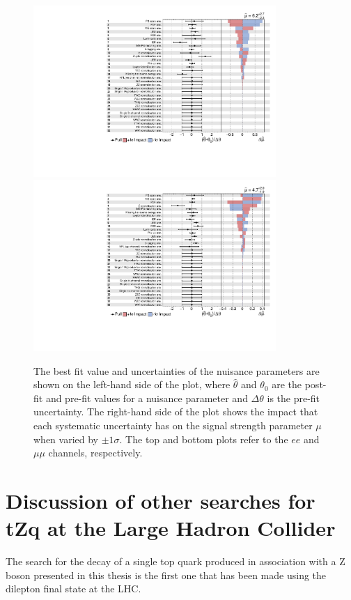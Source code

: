 \begin{figure}[htbp]
\begin{center}
\includegraphics[width=0.82\textwidth]{figs/results/systematicsImpact_ee.pdf}
\\
\includegraphics[width=0.82\textwidth]{figs/results/systematicsImpact_mumu.pdf}
\caption{The best fit value and uncertainties of the nuisance parameters are shown on the left-hand side of the plot, where $\widehat{\theta}$ and $\theta_{0}$ are the post-fit and pre-fit values for a nuisance parameter and $\Delta \theta$ is the pre-fit uncertainty.
The right-hand side of the plot shows the impact that each systematic uncertainty has on the signal strength parameter $\mu$ when varied by $\pm 1 \sigma$.
The top and bottom plots refer to the $ee$ and $\mu\mu$ channels, respectively.}
\label{fig:systematicsPull}
\end{center}
\end{figure}

\section{Discussion of other searches for tZq at the Large Hadron Collider}
The search for the decay of a single top quark produced in association with a Z boson presented in this thesis is the first one that has been made using the dilepton final state at the LHC.

